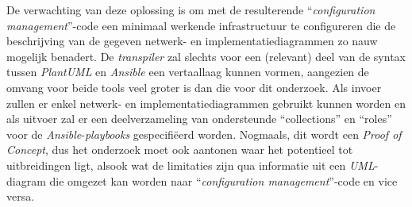 De verwachting van deze oplossing is om met de resulterende ``\emph{configuration management}''-code een minimaal werkende infrastructuur te configureren die de beschrijving van de gegeven netwerk- en implementatiediagrammen zo nauw mogelijk benadert.
De \emph{transpiler} zal slechts voor een (relevant) deel van de syntax tussen \emph{PlantUML} en \emph{Ansible} een vertaallaag kunnen vormen, aangezien de omvang voor beide tools veel groter is dan die voor dit onderzoek.
Als invoer zullen er enkel netwerk- en implementatiediagrammen gebruikt kunnen worden en als uitvoer zal er een deelverzameling van ondersteunde ``collections'' en ``roles'' voor de \emph{Ansible}-\emph{playbooks} gespecifiëerd worden. Nogmaals, dit wordt een \emph{Proof of Concept}, dus het onderzoek moet ook aantonen waar het potentieel tot uitbreidingen ligt, alsook wat de limitaties zijn qua informatie uit een \emph{UML}-diagram die omgezet kan worden naar ``\emph{configuration management}''-code en vice versa.